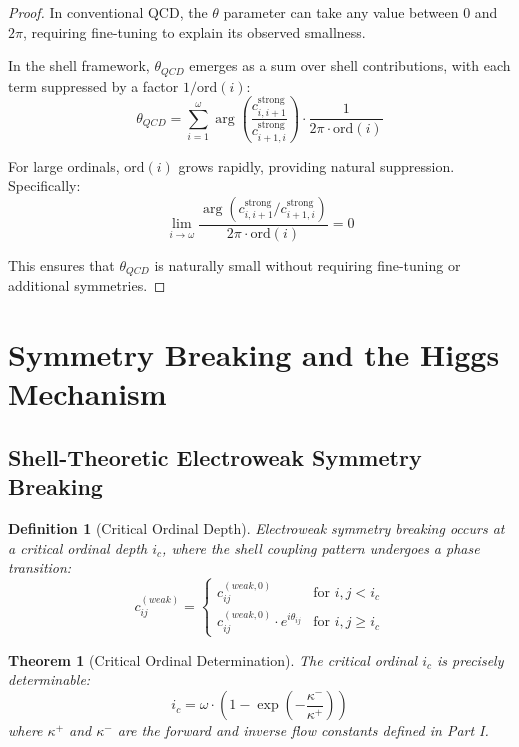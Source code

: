 \documentclass[12pt,a4paper]{article}
\newtheorem{theorem}{Theorem}[section]
\newtheorem{definition}{Definition}[section]
\newcommand{\ord}{\text{ord}}
\begin{document}
\begin{proof}
In conventional QCD, the $\theta$ parameter can take any value between 0 and $2\pi$, requiring fine-tuning to explain its observed smallness.

In the shell framework, $\theta_{QCD}$ emerges as a sum over shell contributions, with each term suppressed by a factor $1/\ord(i)$:
\begin{equation}
\theta_{QCD} = \sum_{i=1}^{\omega} \arg\left(\frac{c_{i,i+1}^{\text{strong}}}{c_{i+1,i}^{\text{strong}}}\right) \cdot \frac{1}{2\pi \cdot \ord(i)}
\end{equation}

For large ordinals, $\ord(i)$ grows rapidly, providing natural suppression. Specifically:
\begin{equation}
\lim_{i \to \omega} \frac{\arg(c_{i,i+1}^{\text{strong}}/c_{i+1,i}^{\text{strong}})}{2\pi \cdot \ord(i)} = 0
\end{equation}

This ensures that $\theta_{QCD}$ is naturally small without requiring fine-tuning or additional symmetries.
\end{proof}

\section{Symmetry Breaking and the Higgs Mechanism}
\label{sec:symmetry-breaking}

\subsection{Shell-Theoretic Electroweak Symmetry Breaking}
\label{subsec:electroweak-breaking}

\begin{definition}[Critical Ordinal Depth]
\label{def:critical-depth}
Electroweak symmetry breaking occurs at a critical ordinal depth $i_c$, where the shell coupling pattern undergoes a phase transition:
\begin{equation}
c_{ij}^{(weak)} = 
\begin{cases}
c_{ij}^{(weak,0)} & \text{for } i,j < i_c \\
c_{ij}^{(weak,0)} \cdot e^{i\theta_{ij}} & \text{for } i,j \geq i_c
\end{cases}
\end{equation}
\end{definition}

\begin{theorem}[Critical Ordinal Determination]
\label{thm:critical-ordinal}
The critical ordinal $i_c$ is precisely determinable:
\begin{equation}
i_c = \omega \cdot \left(1 - \exp\left(-\frac{\kappa^-}{\kappa^+}\right)\right)
\end{equation}
where $\kappa^+$ and $\kappa^-$ are the forward and inverse flow constants defined in Part I.
\end{theorem}
\end{document}
